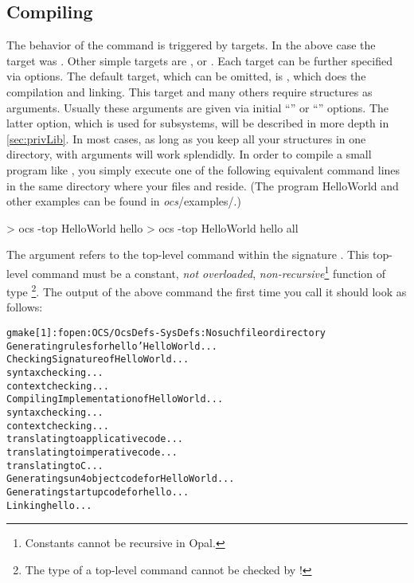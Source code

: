 \subsection{Compiling}

The behavior of the  command is triggered by targets. In the
above case the target was . Other simple targets are
,  or . 
Each target can be further specified via
options. The default target, which can be omitted, is , which
does the compilation and linking. This target and many others require
\opal{} structures as arguments. Usually these arguments are given via
initial ``'' or ``''  options.  The latter option, which
is used for subsystems, will be described in more depth in
\ref{sec:privLib}. In most cases, as long as you keep all your
\opal{} structures in one directory,  with 
arguments will work splendidly.  In order to compile a small program
like , you simply execute one of the following equivalent
command lines in the same directory where your files
 and  reside. (The program
HelloWorld and other examples can be found in {\it ocs}/examples/.)

\begin{prog}
> ocs -top HelloWorld hello 
> ocs -top HelloWorld hello all
\end{prog}

The argument  refers to the top-level command within the
signature .
This top-level command must be a constant, {\em not overloaded},
{\em non-recursive}\footnote{Constants cannot be recursive in Opal.} 
\opal{} function of type 
\footnote{The type of a top-level
command cannot be checked by !}. 
The output of the above  command the first time you call it should
look as follows: 

{\small \begin{alltt}
gmake[1]: fopen: OCS/OcsDefs-SysDefs: No such file or directory
Generating rules for hello'HelloWorld ...
Checking Signature of HelloWorld ...
 syntax checking ...
 context checking ...
Compiling Implementation of HelloWorld ...
 syntax checking ...
 context checking ...
 translating to applicative code ...
 translating to imperative code ...
 translating to C ...
Generating sun4 object code for HelloWorld ...
Generating startup code for hello ...
Linking hello ...
\end{alltt}}

